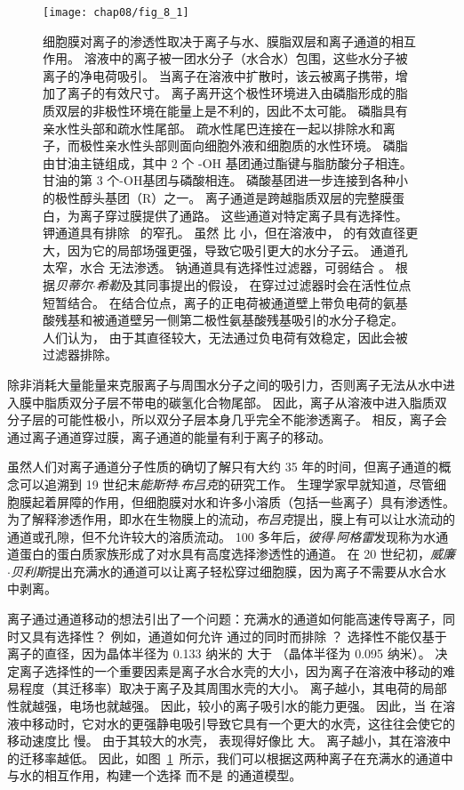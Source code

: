 \begin{figure}[htbp]
	\centering
	\texttt{[image: chap08/fig\_8\_1]}
	\caption{细胞膜对离子的渗透性取决于离子与水、膜脂双层和离子通道的相互作用。
		溶液中的离子被一团水分子（水合水）包围，这些水分子被离子的净电荷吸引。
		当离子在溶液中扩散时，该云被离子携带，增加了离子的有效尺寸。
		离子离开这个极性环境进入由磷脂形成的脂质双层的非极性环境在能量上是不利的，因此不太可能。
		磷脂具有亲水性头部和疏水性尾部。
		疏水性尾巴连接在一起以排除水和离子，而极性亲水性头部则面向细胞外液和细胞质的水性环境。
		磷脂由甘油主链组成，其中 2 个 -OH 基团通过酯键与脂肪酸分子相连。
		甘油的第 3 个-OH基团与磷酸相连。
		磷酸基团进一步连接到各种小的极性醇头基团（R）之一。
		离子通道是跨越脂质双层的完整膜蛋白，为离子穿过膜提供了通路。
		这些通道对特定离子具有选择性。
		钾通道具有排除~ 的窄孔。
		虽然  比  小，但在溶液中， 的有效直径更大，因为它的局部场强更强，导致它吸引更大的水分子云。
		 通道孔太窄，水合  无法渗透。
		钠通道具有选择性过滤器，可弱结合 。
		根据\textit{贝蒂尔$\cdot$希勒}及其同事提出的假设， 在穿过过滤器时会在活性位点短暂结合。
		在结合位点，离子的正电荷被通道壁上带负电荷的氨基酸残基和被通道壁另一侧第二极性氨基酸残基吸引的水分子稳定。
		人们认为， 由于其直径较大，无法通过负电荷有效稳定，因此会被过滤器排除。}
	\label{fig:8_1}
\end{figure}


除非消耗大量能量来克服离子与周围水分子之间的吸引力，否则离子无法从水中进入膜中脂质双分子层不带电的碳氢化合物尾部。
因此，离子从溶液中进入脂质双分子层的可能性极小，所以双分子层本身几乎完全不能渗透离子。
相反，离子会通过离子通道穿过膜，离子通道的能量有利于离子的移动。


虽然人们对离子通道分子性质的确切了解只有大约 35 年的时间，但离子通道的概念可以追溯到 19 世纪末\textit{能斯特$\cdot$布吕克}的研究工作。
生理学家早就知道，尽管细胞膜起着屏障的作用，但细胞膜对水和许多小溶质（包括一些离子）具有渗透性。
为了解释渗透作用，即水在生物膜上的流动，\textit{布吕克}提出，膜上有可以让水流动的通道或孔隙，但不允许较大的溶质流动。
100 多年后，\textit{彼得$\cdot$阿格雷}发现称为水通道蛋白的蛋白质家族形成了对水具有高度选择渗透性的通道。
在 20 世纪初，\textit{威廉$\cdot$贝利斯}提出充满水的通道可以让离子轻松穿过细胞膜，因为离子不需要从水合水中剥离。


离子通过通道移动的想法引出了一个问题：充满水的通道如何能高速传导离子，同时又具有选择性？
例如，通道如何允许  通过的同时而排除 ？
选择性不能仅基于离子的直径，因为晶体半径为 0.133 纳米的  大于 （晶体半径为 0.095 纳米）。
决定离子选择性的一个重要因素是离子水合水壳的大小，因为离子在溶液中移动的难易程度（其迁移率）取决于离子及其周围水壳的大小。
离子越小，其电荷的局部性就越强，电场也就越强。
因此，较小的离子吸引水的能力更强。
因此，当  在溶液中移动时，它对水的更强静电吸引导致它具有一个更大的水壳，这往往会使它的移动速度比  慢。
由于其较大的水壳， 表现得好像比  大。
离子越小，其在溶液中的迁移率越低。
因此，如图~\ref{fig:8_1}~所示，我们可以根据这两种离子在充满水的通道中与水的相互作用，构建一个选择  而不是  的通道模型。


